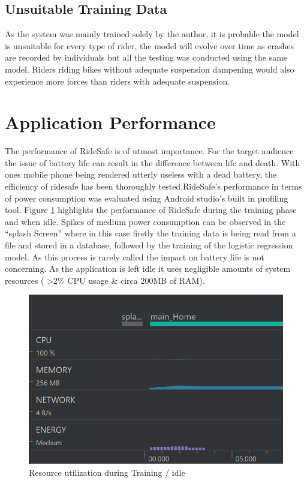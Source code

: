 \subsection*{Unsuitable Training Data}
As the system was mainly trained solely by the author, it is probable the model is unsuitable for every type of rider, the model will evolve over time as crashes are recorded by individuals but all the testing was conducted using the same model. Riders riding bikes without adequate suspension dampening would also experience more forces than riders with adequate suspension.




\newpage



\section{Application Performance}




The performance of RideSafe is of utmost importance. For the target audience the issue of battery life can result in the difference between life and death. With ones mobile phone being rendered utterly useless with a dead battery, the efficiency of ridesafe has been thoroughly tested.RideSafe’s performance in terms of power consumption was evaluated using Android studio's built in profiling tool. Figure \ref{load} highlights the performance of RideSafe during the training phase and when idle. Spikes of medium power consumption can be observed in the “splash Screen” where in this case firstly the training data is being read from a file and stored in a database, followed by the training of the logistic regression model. As this process is rarely called the impact on battery life is not concerning. As the application is left idle it uses negligible amounts of system resources ( >2\% CPU usage \& circa 200MB of RAM).

\begin{figure}[h]
      \centering
      \includegraphics[scale = 1]{evaluation/load.png}
      \caption{Resource utilization during Training / idle}
      \label{load}
\end{figure}




